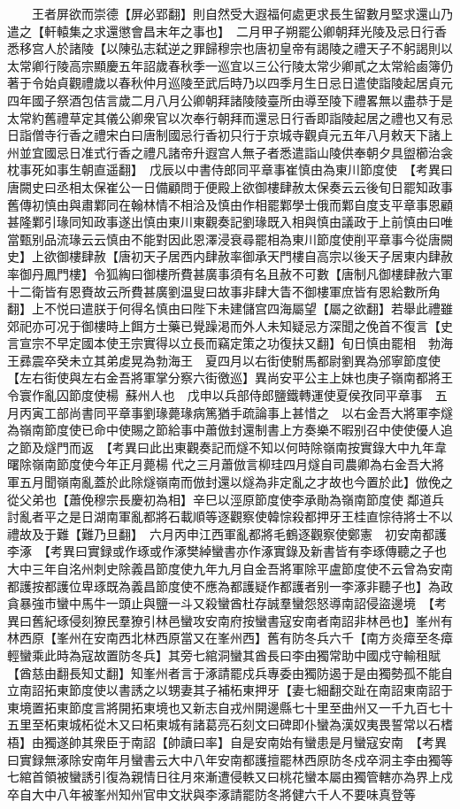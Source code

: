 　　王者屏欲而崇德【屏必郢翻】則自然受大遐福何處更求長生留數月堅求還山乃遣之【軒轅集之求還懲會昌末年之事也】　二月甲子朔罷公卿朝拜光陵及忌日行香悉移宫人於諸陵【以陳弘志弑逆之罪歸穆宗也唐初皇帝有謁陵之禮天子不躬謁則以太常卿行陵高宗顯慶五年詔歲春秋季一巡宜以三公行陵太常少卿貳之太常給鹵簿仍著于令始貞觀禮歲以春秋仲月巡陵至武后時乃以四季月生日忌日遣使詣陵起居貞元四年國子祭酒包佶言歲二月八月公卿朝拜諸陵陵臺所由導至陵下禮畧無以盡恭于是太常約舊禮草定其儀公卿衆官以次奉行朝拜而還忌日行香即詣陵起居之禮也又有忌日詣僧寺行香之禮宋白曰唐制國忌行香初只行于京城寺觀貞元五年八月敕天下諸上州並宜國忌日准式行香之禮凡諸帝升遐宫人無子者悉遣詣山陵供奉朝夕具盥櫛治衾枕事死如事生朝直遥翻】　戊辰以中書侍郎同平章事崔慎由為東川節度使　【考異曰唐闕史曰丞相太保崔公一日備顧問于便殿上欲御樓肆赦太保奏云云後旬日罷知政事舊傳初慎由與肅鄴同在翰林情不相洽及慎由作相罷鄴學士俄而鄴自度支平章事恩顧甚隆鄴引瑑同知政事遂出慎由東川東觀奏記劉瑑既入相與慎由議政于上前慎由曰唯當甄别品流瑑云云慎由不能對因此恩澤浸衰尋罷相為東川節度使削平章事今從唐闕史】上欲御樓肆赦【唐初天子居西内肆赦率御承天門樓自高宗以後天子居東内肆赦率御丹鳳門樓】令狐綯曰御樓所費甚廣事須有名且赦不可數【唐制凡御樓肆赦六軍十二衛皆有恩賚故云所費甚廣劉温叟曰故事非肆大眚不御樓軍庶皆有恩給數所角翻】上不悦曰遣朕于何得名慎由曰陛下未建儲宫四海屬望【屬之欲翻】若舉此禮雖郊祀亦可况于御樓時上餌方士藥已覺躁渇而外人未知疑忌方深聞之俛首不復言【史言宣宗不早定國本使王宗實得以立長而竊定策之功復扶又翻】旬日慎由罷相　勃海王彞震卒癸未立其弟䖍晃為勃海王　夏四月以右街使駙馬都尉劉異為邠寧節度使【左右街使與左右金吾將軍掌分察六街徼巡】異尚安平公主上妹也庚子嶺南都將王令寰作亂囚節度使楊蘇州人也　戊申以兵部侍郎鹽鐵轉運使夏侯孜同平章事　五月丙寅工部尚書同平章事劉瑑薨瑑病篤猶手疏論事上甚惜之　以右金吾大將軍李燧為嶺南節度使已命中使賜之節給事中蕭倣封還制書上方奏樂不暇别召中使使優人追之節及燧門而返　【考異曰此出東觀奏記而燧不知以何時除嶺南按實錄大中九年韋曙除嶺南節度使今年正月薨楊代之三月蕭倣言柳珪四月燧自司農卿為右金吾大將軍五月聞嶺南亂蓋於此除燧嶺南而倣封還以燧為非定亂之才故也今置於此】倣俛之從父弟也【蕭俛穆宗長慶初為相】辛巳以涇原節度使李承勛為嶺南節度使鄰道兵討亂者平之是日湖南軍亂都將石載順等逐觀察使韓悰殺都押牙王桂直悰待將士不以禮故及于難【難乃旦翻】　六月丙申江西軍亂都將毛鶴逐觀察使鄭憲　初安南都護李涿　【考異曰實録或作琢或作涿樊綽蠻書亦作涿實錄及新書皆有李琢傳聽之子也大中三年自洺州刺史除義昌節度使九年九月自金吾將軍除平盧節度使不云曾為安南都護按都護位卑琢既為義昌節度使不應為都護疑作都護者别一李涿非聽子也】為政貪暴強市蠻中馬牛一頭止與鹽一斗又殺蠻酋杜存誠羣蠻怨怒導南詔侵盜邊境　【考異曰舊紀琢侵刻獠民羣獠引林邑蠻攻安南府按蠻書寇安南者南詔非林邑也】峯州有林西原【峯州在安南西北林西原當又在峯州西】舊有防冬兵六千【南方炎瘴至冬瘴輕蠻乘此時為寇故置防冬兵】其旁七綰洞蠻其酋長曰李由獨常助中國戍守輸租賦【酋慈由翻長知丈翻】知峯州者言于涿請罷戍兵專委由獨防遏于是由獨勢孤不能自立南詔拓東節度使以書誘之以甥妻其子補柘東押牙【妻七細翻交趾在南詔東南詔于東境置拓東節度言將開拓東境也又新志自戎州開邊縣七十里至曲州又一千九百七十五里至柘東城柘從木又曰柘東城有諸葛亮石刻文曰碑即仆蠻為漢奴夷畏誓常以石榰梧】由獨遂帥其衆臣于南詔【帥讀曰率】自是安南始有蠻患是月蠻寇安南　【考異曰實録無涿除安南年月蠻書云大中八年安南都護擅罷林西原防冬戍卒洞主李由獨等七綰首領被蠻誘引復為親情日往月來漸遭侵軼又曰桃花蠻本屬由獨管轄亦為界上戍卒自大中八年被峯州知州官申文狀與李涿請罷防冬將健六千人不要味真登等